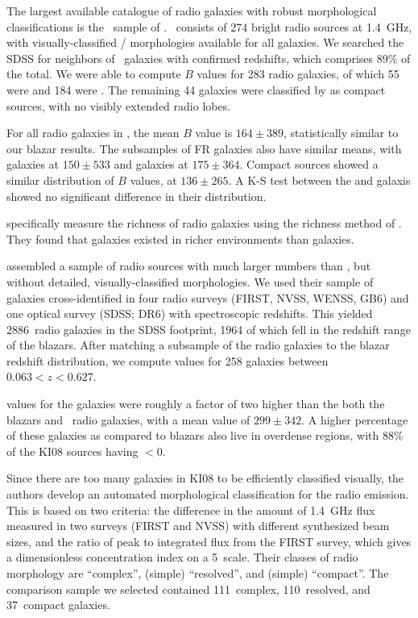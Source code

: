 \documentclass{emulateapj}
\begin{document}
The largest available catalogue of radio galaxies with robust morphological classifications is the \config~sample of \citet{gen08}. \config~consists of 274 bright radio sources at 1.4~GHz, with visually-classified \FRI{}/\FRII{} morphologies available for all galaxies. We searched the SDSS for neighbors of \config~galaxies with confirmed redshifts, which comprises 89\% of the total. We were able to compute $B$ values for 283 radio galaxies, of which 55 were \FRI{} and 184 were \FRII{}. The remaining 44 galaxies were classified by \citet{gen08} as compact sources, with no visibly extended radio lobes. 

For all radio galaxies in \config, the mean $B$ value is $164\pm389$, statistically similar to our blazar results. The subsamples of FR galaxies also have similar means, with \FRI{} galaxies at $150\pm533$ and \FRII{} galaxies at $175\pm364$. Compact sources showed a similar distribution of $B$ values, at $136\pm265$. A K-S test between the \FRI{} and \FRII{} galaxis showed no significant difference in their distribution. 

\citet{gen13} specifically measure the richness of radio galaxies using the richness method of \citet{win11}. They found that \FRI{} galaxies existed in richer environments than \FRII{} galaxies.

\citet[][KI08]{kim08} assembled a sample of radio sources with much larger numbers than \config, but without detailed, visually-classified morphologies. We used their sample of galaxies cross-identified in four radio surveys (FIRST, NVSS, WENSS, GB6) and one optical survey (SDSS; DR6) with spectroscopic redshifts. This yielded 2886~radio galaxies in the SDSS footprint, 1964 of which fell in the redshift range of the blazars. After matching a subsample of the radio galaxies to the blazar redshift distribution, we compute \bgb{} values for 258 galaxies between $0.063<z<0.627$.  

\bgb{} values for the \citet{kim08} galaxies were roughly a factor of two higher than the both the blazars and \config~radio galaxies, with a mean value of $299\pm342$. A higher percentage of these galaxies as compared to blazars also live in overdense regions, with 88\% of the KI08 sources having \bgb$<0$. 

Since there are too many galaxies in KI08 to be efficiently classified visually, the authors develop an automated morphological classification for the radio emission. This is based on two criteria: the difference in the amount of 1.4~GHz flux measured in two surveys (FIRST and NVSS) with different synthesized beam sizes, and the ratio of peak to integrated flux from the FIRST survey, which gives a dimensionless concentration index on a 5\arcsec~scale. Their classes of radio morphology are ``complex'', (simple) ``resolved'', and (simple) ``compact''. The comparison sample we selected contained 111~complex, 110~resolved, and 37~compact galaxies. 
\end{document}
